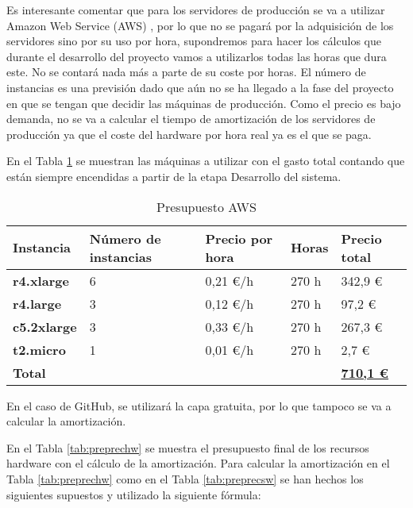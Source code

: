 Es interesante comentar que para los servidores de producción se va a utilizar Amazon Web Service (AWS) \cite{Tfg:aws}, por lo que no se pagará por la adquisición de los servidores sino por su uso por hora, supondremos para hacer los cálculos que durante el desarrollo del proyecto vamos a utilizarlos todas las horas que dura este. No se contará nada más a parte de su coste por horas. El número de instancias es una previsión dado que aún no se ha llegado a la fase del proyecto en que se tengan que decidir las máquinas de producción. Como el precio es bajo demanda, no se va a calcular el tiempo de amortización de los servidores de producción ya que el coste del hardware por hora real ya es el que se paga. 

En el Tabla \ref{tab:prepaws} se muestran las máquinas a utilizar con el gasto total contando que están siempre encendidas a partir de la etapa Desarrollo del sistema.

\begin{table}[H]\label{tab:prepaws}
	\centering
	\begin{tabular}{|l|l|l|l|l|}
		\hline
		\textbf{Instancia}  & \textbf{Número de instancias} & \textbf{Precio por hora} & \textbf{Horas} & \textbf{Precio total} \\ \hline
		\textbf{r4.xlarge}  & 6                             & 0,21 €/h \cite{Tfg:ec2price} & 270 h          & 342,9 €               \\ \hline
		\textbf{r4.large}   & 3                             & 0,12 €/h \cite{Tfg:ec2price} & 270 h          & 97,2 €                \\ \hline
		\textbf{c5.2xlarge} & 3                             & 0,33 €/h \cite{Tfg:ec2price} & 270 h          & 267,3 €               \\ \hline
		\textbf{t2.micro}   & 1                             & 0,01 €/h \cite{Tfg:ec2price} & 270 h          & 2,7 €                 \\ \hline
		\multicolumn{4}{|l|}{\textbf{Total}} & \textbf{\underline{710,1 €}}                                                   \\ \hline
	\end{tabular}
	\caption{Presupuesto AWS}
\end{table}

En el caso de GitHub, se utilizará la capa gratuita, por lo que tampoco se va a calcular la amortización.

En el Tabla \ref{tab:preprechw} se muestra el presupuesto final de los recursos hardware con el cálculo de la amortización. Para calcular la amortización en el Tabla \ref{tab:preprechw} como en el Tabla \ref{tab:preprecsw} se han hechos los siguientes supuestos y utilizado la siguiente fórmula:

